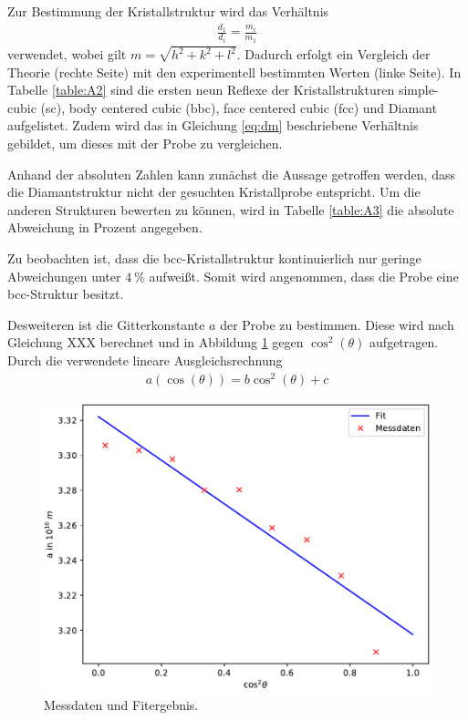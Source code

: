 Zur Bestimmung der Kristallstruktur wird das Verhältnis
\begin{align}
	\frac{d_1}{d_i}=\frac{m_i}{m_1}
	\label{eq:dm}
\end{align}
verwendet, wobei gilt $m=\sqrt{h^2+k^2+l^2}$. Dadurch erfolgt ein Vergleich der Theorie (rechte Seite) mit den experimentell bestimmten Werten (linke Seite).
In Tabelle \ref{table:A2} sind die ersten neun Reflexe der Kristallstrukturen simple-cubic (sc), body centered cubic (bbc), face centered cubic (fcc) und Diamant aufgelistet. Zudem wird das in Gleichung \ref{eq:dm} beschriebene Verhältnis gebildet, um dieses mit der Probe zu vergleichen.



Anhand der absoluten Zahlen kann zunächst die Aussage getroffen werden, dass die Diamantstruktur nicht der gesuchten Kristallprobe entspricht. Um die anderen Strukturen bewerten zu können, wird in Tabelle \ref{table:A3} die absolute Abweichung in Prozent angegeben.



Zu beobachten ist, dass die bcc-Kristallstruktur kontinuierlich nur geringe Abweichungen unter $\SI{4}{\percent}$ aufweißt. Somit wird angenommen, dass die Probe eine bcc-Struktur besitzt.

Desweiteren ist die Gitterkonstante $a$ der Probe zu bestimmen. Diese wird nach Gleichung XXX berechnet und in Abbildung \ref{fig:plot1} gegen $\cos^2{(\theta)}$ aufgetragen. Durch die verwendete lineare Ausgleichsrechnung
\begin{align}
	a(\cos{(\theta)})= b\cos^2{(\theta)} + c
	\label{eq:FIT}
\end{align}

\begin{figure}
  \centering
  \includegraphics[scale=0.75]{build/Metall.pdf}
  \caption{Messdaten und Fitergebnis.}
  \label{fig:plot1}
\end{figure}


